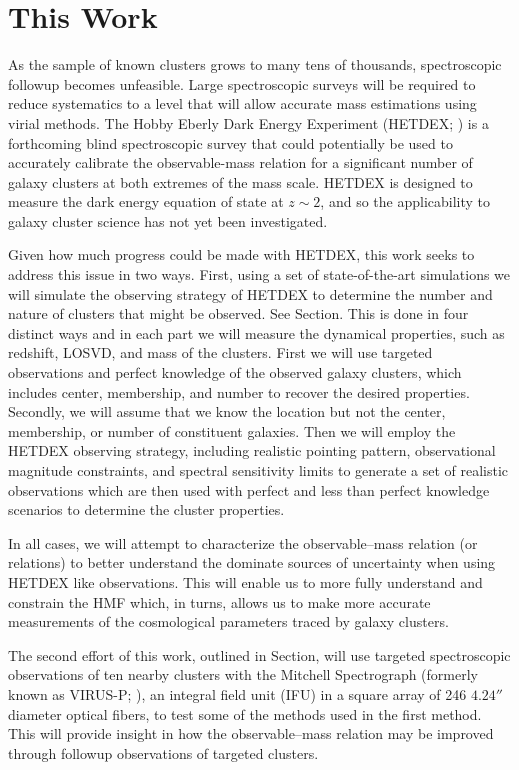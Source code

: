 \section{This Work}
As the sample of known clusters grows to many tens of thousands, spectroscopic followup becomes unfeasible. Large spectroscopic surveys will be required to reduce systematics to a level that will allow accurate mass estimations using virial methods. The Hobby Eberly Dark Energy Experiment (HETDEX; \citealt{Hill2008}) is a forthcoming blind spectroscopic survey that could potentially be used to accurately calibrate the observable-mass relation for a significant number of galaxy clusters at both extremes of the mass scale. HETDEX is designed to measure the dark energy equation of state at $z\sim2$, and so the applicability to galaxy cluster science has not yet been investigated.

Given how much progress could be made with HETDEX, this work seeks to address this issue in two ways. First, using a set of state-of-the-art simulations we will simulate the observing strategy of HETDEX to determine the number and nature of clusters that might be observed. See Section. This is done in four distinct ways and in each part we will measure the dynamical properties, such as redshift, LOSVD, and mass of the clusters. First we will use targeted observations and perfect knowledge of the observed galaxy clusters, which includes center, membership, and number to recover the desired properties. Secondly, we will assume that we know the location but not the center, membership, or number of constituent galaxies. Then we will employ the HETDEX observing strategy, including realistic pointing pattern, observational magnitude constraints, and spectral sensitivity limits to generate a set of realistic observations which are then used with perfect and less than perfect knowledge scenarios to determine the cluster properties. 

In all cases, we will attempt to characterize the observable--mass relation (or relations) to better understand the dominate sources of uncertainty when using HETDEX like observations. This will enable us to more fully understand and constrain the HMF which, in turns, allows us to make more accurate measurements of the cosmological parameters traced by galaxy clusters.

The second effort of this work, outlined in Section, will use targeted spectroscopic observations of ten nearby clusters with the Mitchell Spectrograph (formerly known as VIRUS-P; \citealt{Hill2008a}), an integral field unit (IFU) in a square array of 246 $4.24''$ diameter optical fibers, to test some of the methods used in the first method. This will provide insight in how the observable--mass relation may be improved through followup observations of targeted clusters.
